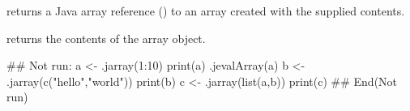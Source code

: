 \begin{Value}
 returns a Java array reference () to an
array created with the supplied contents.

 returns the contents of the array object.
\end{Value}
\begin{Examples}
\begin{ExampleCode}
## Not run: 
a <- .jarray(1:10)
print(a)
.jevalArray(a)
b <- .jarray(c("hello","world"))
print(b)
c <- .jarray(list(a,b))
print(c)
## End(Not run)
\end{ExampleCode}
\end{Examples}

